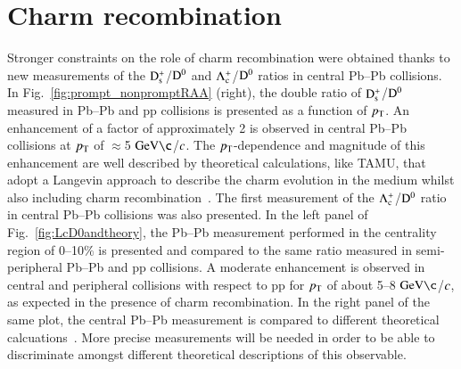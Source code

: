 \documentclass[3p,times,procedia]{elsarticle}
\newcommand{\GeVc}{\mathrm{GeV\c}}
\newcommand{\pt}{p_{\rm T}}
\newcommand{\Dzero}{{\rm D^0}}
\newcommand{\Ds}{{\rm D_{s}^+}}
\newcommand{\Lc}{{\rm \Lambda_{c}^+}}
\begin{document}
\section{Charm recombination}
\label{recombination}
Stronger constraints on the role of charm recombination were obtained thanks to new measurements of the $\Ds$/$\Dzero$ and $\Lc$/$\Dzero$ ratios
in central Pb--Pb collisions. In Fig.~\ref{fig:prompt_nonpromptRAA} (right), the double ratio of $\Ds$/$\Dzero$ measured in Pb--Pb and pp collisions 
is presented as a function of $\pt$. An enhancement of a factor of approximately 2 is observed in central Pb--Pb collisions at $\pt$ of $\approx$5 $\GeVc$/$\it{c}$. The $\pt$-dependence and magnitude 
of this enhancement are well described by theoretical calculations, like TAMU, that adopt a Langevin approach to describe the charm evolution in the 
medium whilst also including charm recombination~\cite{tamu}. The first measurement of the $\Lc$/$\Dzero$ ratio in central Pb--Pb collisions was also presented. 
In the left panel of Fig.~\ref{fig:LcD0andtheory}, the Pb--Pb measurement performed in the centrality region of 0--10$\%$ is presented and compared to the same ratio
measured in semi-peripheral Pb--Pb and pp collisions. A moderate enhancement is observed in central and peripheral collisions with respect to pp for $\pt$ of about 5--8 $\GeVc$/$\it{c}$,
as expected in the presence of charm recombination. In the right panel of the same plot, the central Pb--Pb measurement is compared to different theoretical calcuations~\cite{catania,shm,pythia8}.
More precise measurements will be needed in order to be able to discriminate amongst different theoretical descriptions of this observable.
\end{document}
